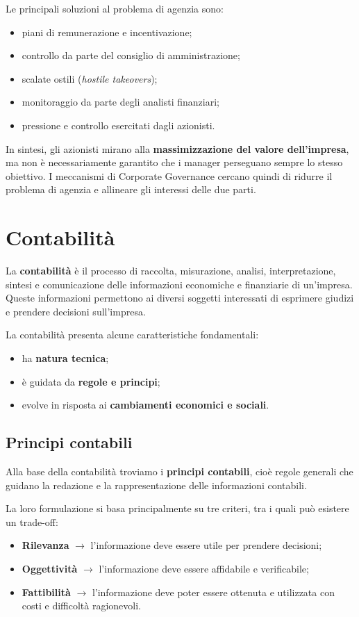 \noindent Le principali soluzioni al problema di agenzia sono:
\begin{itemize}
    \item piani di remunerazione e incentivazione;
    \item controllo da parte del consiglio di amministrazione;
    \item scalate ostili (\textit{hostile takeovers});
    \item monitoraggio da parte degli analisti finanziari;
    \item pressione e controllo esercitati dagli azionisti.
\end{itemize}

\noindent In sintesi, gli azionisti mirano alla \textbf{massimizzazione del valore dell'impresa}, ma non è necessariamente garantito che i manager perseguano sempre lo stesso obiettivo. I meccanismi di Corporate Governance cercano quindi di ridurre il problema di agenzia e 
allineare gli interessi delle due parti.

\section{Contabilità}
La \textbf{contabilità} è il processo di raccolta, misurazione, analisi, interpretazione, sintesi e comunicazione delle 
informazioni economiche e finanziarie di un'impresa. Queste informazioni permettono ai diversi soggetti interessati di esprimere giudizi e prendere decisioni sull'impresa.

\noindent La contabilità presenta alcune caratteristiche fondamentali:
\begin{itemize}
    \item ha \textbf{natura tecnica};
    \item è guidata da \textbf{regole e principi};
    \item evolve in risposta ai \textbf{cambiamenti economici e sociali}.
\end{itemize}

\subsection{Principi contabili}
Alla base della contabilità troviamo i \textbf{principi contabili}, cioè regole generali che guidano la redazione e la rappresentazione 
delle informazioni contabili.

\noindent La loro formulazione si basa principalmente su tre criteri, tra i quali può esistere un trade-off:
\begin{itemize}
    \item \textbf{Rilevanza} $\rightarrow$ l'informazione deve essere utile per prendere decisioni;
    \item \textbf{Oggettività} $\rightarrow$ l'informazione deve essere affidabile e verificabile;
    \item \textbf{Fattibilità} $\rightarrow$ l'informazione deve poter essere ottenuta e utilizzata con costi e difficoltà ragionevoli.
\end{itemize}


